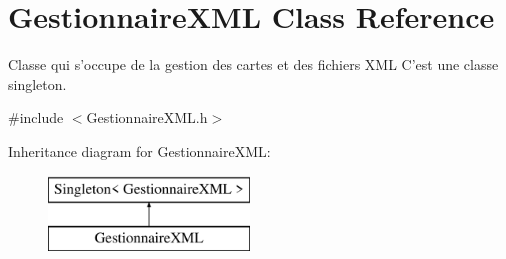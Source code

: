 \hypertarget{class_gestionnaire_x_m_l}{\section{Gestionnaire\-X\-M\-L Class Reference}
\label{class_gestionnaire_x_m_l}
}


Classe qui s'occupe de la gestion des cartes et des fichiers X\-M\-L C'est une classe singleton.  




{\ttfamily \#include $<$Gestionnaire\-X\-M\-L.\-h$>$}

Inheritance diagram for Gestionnaire\-X\-M\-L\-:\begin{figure}[H]
\begin{center}
\leavevmode
\includegraphics[height=2.000000cm]{class_gestionnaire_x_m_l}
\end{center}
\end{figure}
